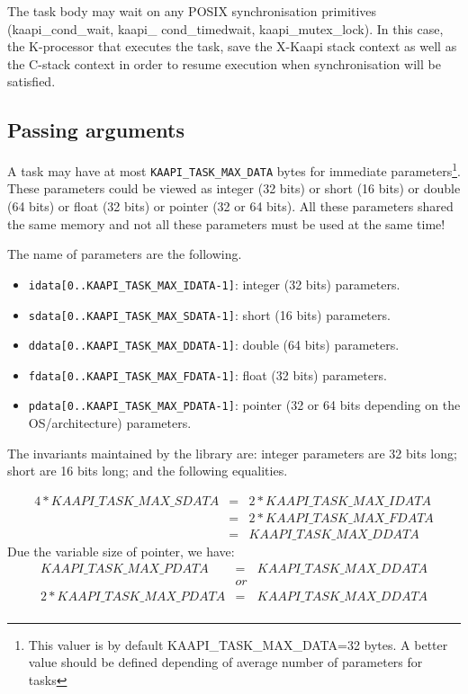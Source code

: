 \documentclass{report}
\newcommand{\kaapi}{\textsc{X}-Kaapi\xspace}
\begin{document}
The task body may wait on any POSIX synchronisation primitives (kaapi\_cond\_wait, kaapi\_ cond\_timedwait, kaapi\_mutex\_lock). In this case, the K-processor that executes the task, save the \kaapi stack context as well as the C-stack context in order to resume execution when synchronisation will be satisfied.

\subsection{Passing arguments} \label{sec:param}

A task may have at most \verb+KAAPI_TASK_MAX_DATA+ bytes for immediate parameters\footnote{This valuer is by default KAAPI\_TASK\_MAX\_DATA=32 bytes. A better value should be defined depending of average number of parameters for tasks}. These parameters could be viewed as integer (32 bits) or short (16 bits) or double (64 bits) or float (32 bits) or pointer (32 or 64 bits). All these parameters shared the same memory and not all these parameters must be used at the same time!

The name of parameters are the following.
\begin{itemize}
\item \verb+idata[0..KAAPI_TASK_MAX_IDATA-1]+: integer (32 bits) parameters.
\item \verb+sdata[0..KAAPI_TASK_MAX_SDATA-1]+: short (16 bits) parameters.
\item \verb+ddata[0..KAAPI_TASK_MAX_DDATA-1]+: double (64 bits) parameters.
\item \verb+fdata[0..KAAPI_TASK_MAX_FDATA-1]+: float (32 bits) parameters.
\item \verb+pdata[0..KAAPI_TASK_MAX_PDATA-1]+: pointer (32 or 64 bits depending on the OS/architecture) parameters.
\end{itemize}

The invariants maintained by the library are: integer parameters are 32 bits long; short are 16 bits long;  and the following equalities.
\begin{small}
$$
\begin{array}{ccc}
4 * KAAPI\_TASK\_MAX\_SDATA &   = & 2 * KAAPI\_TASK\_MAX\_IDATA \\
 & = & 2 * KAAPI\_TASK\_MAX\_FDATA \\
 & = &  KAAPI\_TASK\_MAX\_DDATA
\end{array}
$$
Due the variable size of pointer, we have:
$$ 
\begin{array}{ccc}
KAAPI\_TASK\_MAX\_PDATA &   = &  KAAPI\_TASK\_MAX\_DDATA \\
 & or &\\
2*KAAPI\_TASK\_MAX\_PDATA &   = &  KAAPI\_TASK\_MAX\_DDATA \\
\end{array}
$$
\end{small}
\end{document}
